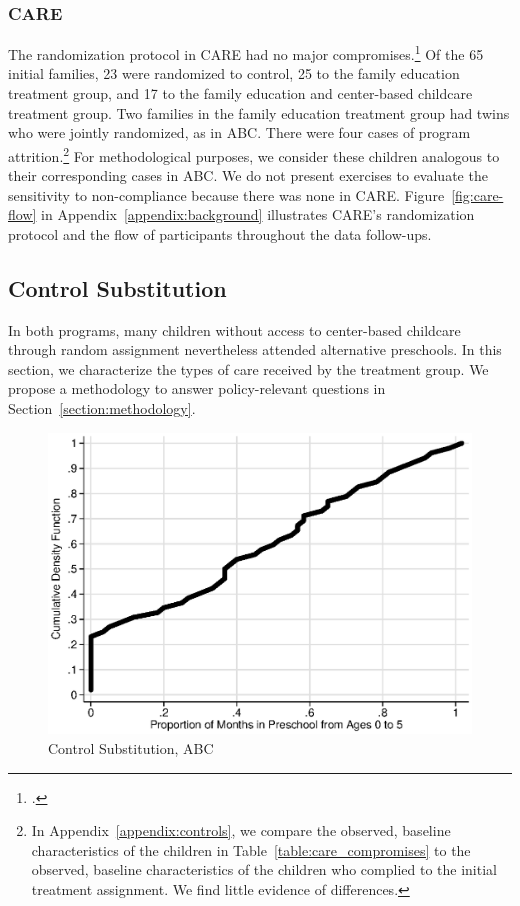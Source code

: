 \subsubsection{CARE}

\noindent The randomization protocol in CARE had no major compromises.\footnote{\citet{Wasik_Ramey_etal_1990_CD,Burchinal_Campbell_etal_1997_CD}.} Of the 65 initial families, 23 were randomized to control, 25 to the family education treatment group, and 17 to the family education and center-based childcare treatment group. Two families in the family education treatment group had twins who were jointly randomized, as in ABC. There were four cases of program attrition.\footnote{In Appendix~\ref{appendix:controls}, we compare the observed, baseline characteristics of the children in Table~\ref{table:care_compromises} to the observed, baseline characteristics of the children who complied to the initial treatment assignment. We find little evidence of differences.} For methodological purposes, we consider these children analogous to their corresponding cases in ABC. We do not present exercises to evaluate the sensitivity to non-compliance because there was none in CARE. Figure~\ref{fig:care-flow} in Appendix~\ref{appendix:background} illustrates CARE's randomization protocol and the flow of participants throughout the data follow-ups.\\

\subsection{Control Substitution}

\noindent In both programs, many children without access to center-based childcare through random assignment nevertheless attended alternative preschools. In this section, we characterize the types of care received by the treatment group. We propose a methodology to answer policy-relevant questions in Section~\ref{section:methodology}.\\

\begin{figure}[H]
		\caption{Control Substitution, ABC} \label{fig:treatsubabc}
		\includegraphics[width=.9\columnwidth]{output/abc_controlcontamination_months.eps}
\end{figure}

